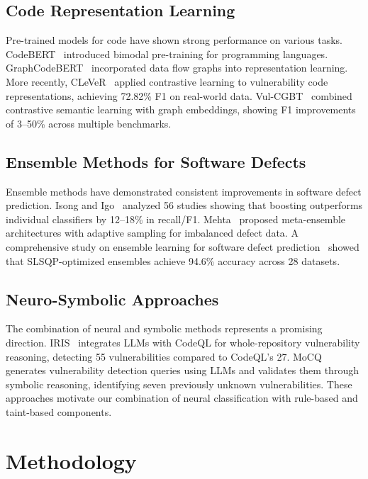 \documentclass[12pt,a4paper]{article}
\begin{document}
\subsection{Code Representation Learning}

Pre-trained models for code have shown strong performance on various tasks. CodeBERT~\cite{feng2020codebert} introduced bimodal pre-training for programming languages. GraphCodeBERT~\cite{guo2021graphcodebert} incorporated data flow graphs into representation learning. More recently, CLeVeR~\cite{clever2025} applied contrastive learning to vulnerability code representations, achieving 72.82\% F1 on real-world data. Vul-CGBT~\cite{vulcgbt2026} combined contrastive semantic learning with graph embeddings, showing F1 improvements of 3--50\% across multiple benchmarks.

\subsection{Ensemble Methods for Software Defects}

Ensemble methods have demonstrated consistent improvements in software defect prediction. Isong and Igo~\cite{isong2025ensemble} analyzed 56 studies showing that boosting outperforms individual classifiers by 12--18\% in recall/F1. Mehta~\cite{mehta2026adaptive} proposed meta-ensemble architectures with adaptive sampling for imbalanced defect data. A comprehensive study on ensemble learning for software defect prediction~\cite{ensemble2026} showed that SLSQP-optimized ensembles achieve 94.6\% accuracy across 28 datasets.

\subsection{Neuro-Symbolic Approaches}

The combination of neural and symbolic methods represents a promising direction. IRIS~\cite{li2024iris} integrates LLMs with CodeQL for whole-repository vulnerability reasoning, detecting 55 vulnerabilities compared to CodeQL's 27. MoCQ~\cite{mocq2025} generates vulnerability detection queries using LLMs and validates them through symbolic reasoning, identifying seven previously unknown vulnerabilities. These approaches motivate our combination of neural classification with rule-based and taint-based components.

\section{Methodology}
\label{sec:methodology}
\end{document}
